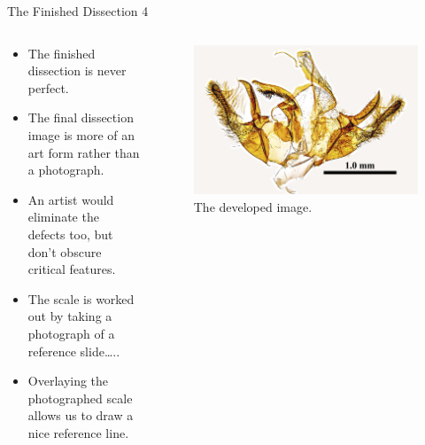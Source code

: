 \documentclass[
  ignorenonframetext,
]{beamer}
\providecommand{\tightlist}{%
  \setlength{\itemsep}{0pt}\setlength{\parskip}{0pt}}
\begin{document}
\begin{frame}{The Finished Dissection 4}
\protect\hypertarget{the-finished-dissection-4}{}
\begin{columns}[T]
\begin{column}{0.5\textwidth}
\begin{itemize}
\tightlist
\item
  The finished dissection is never perfect.
\item
  The final dissection image is more of an art form rather than a
  photograph.
\item
  An artist would eliminate the defects too, but don't obscure critical
  features.
\item
  The scale is worked out by taking a photograph of a reference
  slide\ldots..
\item
  Overlaying the photographed scale allows us to draw a nice reference
  line.
\end{itemize}
\end{column}

\begin{column}{0.5\textwidth}
\begin{figure}
\centering
\includegraphics{./images/PJP20220218-001-developed-dissection.jpg}
\caption{The developed image.}
\end{figure}
\end{column}
\end{columns}
\end{frame}
\end{document}

